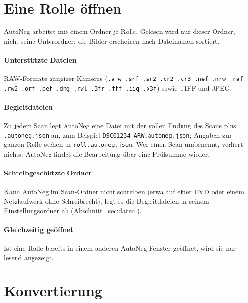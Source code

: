 \documentclass[a4paper,11pt,parskip=half,DIV=12]{scrartcl}
\newcommand{\datei}[1]{\texttt{#1}}                   %
\begin{document}
\section{Eine Rolle öffnen}

AutoNeg arbeitet mit einem Ordner je Rolle. Gelesen wird nur dieser Ordner, nicht seine
Unterordner; die Bilder erscheinen nach Dateinamen sortiert.

\paragraph{Unterstützte Dateien} RAW-Formate gängiger Kameras (\datei{.arw .srf .sr2 .cr2 .cr3
.nef .nrw .raf .rw2 .orf .pef .dng .rwl .3fr .fff .iiq .x3f}) sowie TIFF und JPEG.

\paragraph{Begleitdateien} Zu jedem Scan legt AutoNeg eine Datei mit der vollen Endung des
Scans plus \datei{.autoneg.json} an, zum Beispiel \datei{DSC01234.ARW.autoneg.json}; Angaben zur
ganzen Rolle stehen in \datei{roll.autoneg.json}. Wer einen Scan umbenennt, verliert nichts:
AutoNeg findet die Bearbeitung über eine Prüfsumme wieder.

\paragraph{Schreibgeschützte Ordner} Kann AutoNeg im Scan-Ordner nicht schreiben (etwa auf einer
DVD oder einem Netzlaufwerk ohne Schreibrecht), legt es die Begleitdateien in seinem
Einstellungsordner ab (Abschnitt~\ref{sec:daten}).

\paragraph{Gleichzeitig geöffnet} Ist eine Rolle bereits in einem anderen AutoNeg-Fenster
geöffnet, wird sie nur lesend angezeigt.

\section{Konvertierung}\label{sec:konv}
\end{document}
